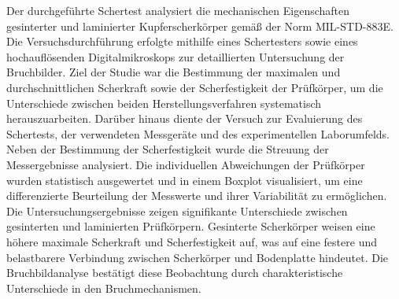 Der durchgeführte Schertest analysiert die mechanischen Eigenschaften gesinterter und laminierter Kupferscherkörper gemäß der Norm MIL-STD-883E. Die Versuchsdurchführung erfolgte mithilfe eines Schertesters sowie eines hochauflösenden Digitalmikroskops zur detaillierten Untersuchung der Bruchbilder. Ziel der Studie war die Bestimmung der maximalen und durchschnittlichen Scherkraft sowie der Scherfestigkeit der Prüfkörper, um die Unterschiede zwischen beiden Herstellungsverfahren systematisch herauszuarbeiten. Darüber hinaus diente der Versuch zur Evaluierung des Schertests, der verwendeten Messgeräte und des experimentellen Laborumfelds.\\
Neben der Bestimmung der Scherfestigkeit wurde die Streuung der Messergebnisse analysiert. Die individuellen Abweichungen der Prüfkörper wurden statistisch ausgewertet und in einem Boxplot visualisiert, um eine differenzierte Beurteilung der Messwerte und ihrer Variabilität zu ermöglichen.\\
Die Untersuchungsergebnisse zeigen signifikante Unterschiede zwischen gesinterten und laminierten Prüfkörpern. Gesinterte Scherkörper weisen eine höhere maximale Scherkraft und Scherfestigkeit auf, was auf eine festere und belastbarere Verbindung zwischen Scherkörper und Bodenplatte hindeutet. Die Bruchbildanalyse bestätigt diese Beobachtung durch charakteristische Unterschiede in den Bruchmechanismen.\\